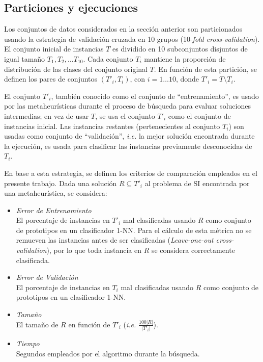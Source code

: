 \subsection{Particiones y ejecuciones}

Los conjuntos de datos considerados en la sección anterior son particionados usando la estrategia de validación cruzada en 10 grupos (10-\emph{fold cross-validation}). El conjunto inicial de instancias $T$ es dividido en 10 subconjuntos disjuntos de igual tamaño $T_1, T_2, \dots T_{10}$. Cada conjunto $T_i$ mantiene la proporción de distribución de las clases del conjunto original $T$. En función de esta partición, se definen los pares de conjuntos $(T'_i, T_i)$, con $i = 1 \dots 10$, donde $T'_i = T \setminus T_i$.

El conjunto $T'_i$, también conocido como el conjunto de ``entrenamiento'', es usado por las metaheurísticas durante el proceso de búsqueda para evaluar soluciones intermedias; en vez de usar $T$, se usa el conjunto $T'_i$ como el conjunto de instancias inicial. Las instancias restantes (pertenecientes al conjunto $T_i$) son usadas como conjunto de ``validación'', \emph{i.e.} la mejor solución encontrada durante la ejecución, es usada para clasificar las instancias previamente desconocidas de $T_i$.

En base a esta estrategia, se definen los criterios de comparación empleados en el presente trabajo. Dada una solución $R \subseteq T'_i$ al problema de SI encontrada por una metaheurística, se considera:

\begin{itemize}
\item \emph{Error de Entrenamiento}\\
El porcentaje de instancias en $T'_i$ mal clasificadas usando $R$ como conjunto de prototipos en un clasificador 1-NN. Para el cálculo de esta métrica no se remueven las instancias antes de ser clasificadas (\emph{Leave-one-out cross-validation}), por lo que toda instancia en $R$ se considera correctamente clasificada.
\item \emph{Error de Validación}\\
El porcentaje de instancias en $T_i$ mal clasificadas usando $R$ como conjunto de prototipos en un clasificador 1-NN.
\item \emph{Tamaño}\\
El tamaño de $R$ en función de $T'_i$ (\emph{i.e.} $\frac{100 \vert R \vert}{\vert T'_i \vert}$).
\item \emph{Tiempo}\\
Segundos empleados por el algoritmo durante la búsqueda.
\end{itemize} 

